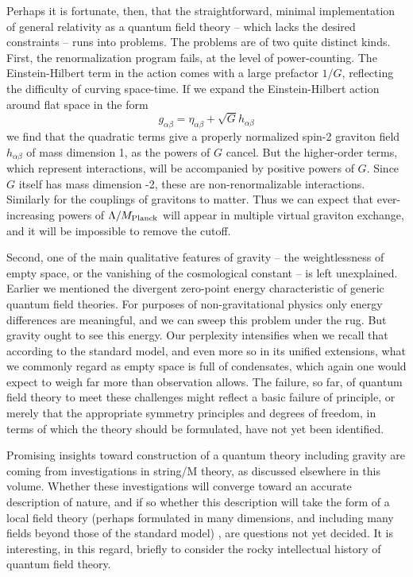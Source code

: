 \documentclass[aps,epsf]{revtex4}
\begin{document}
Perhaps it is fortunate, then, that the straightforward, minimal
implementation of general relativity as a quantum field theory --
which lacks the desired constraints -- runs into problems.  The
problems are of two quite distinct kinds.  First, the renormalization
program fails, at the level of power-counting.  The Einstein-Hilbert
term in the action comes with a large prefactor $1/G$, reflecting the
difficulty of curving space-time.  If we expand the Einstein-Hilbert
action around flat space in the form
\begin{equation}
g_{\alpha \beta} =
\eta_{\alpha\beta} +  \sqrt G h_{\alpha\beta}
\end{equation}
we find
that  the quadratic terms give a properly normalized spin-2  graviton
field $h_{\alpha\beta}$ of mass dimension 1, as the powers of $G$
cancel.   But the higher-order terms, which represent interactions,
will be accompanied by positive powers of $G$.  Since $G$ itself has
mass dimension -2, these are non-renormalizable interactions.
Similarly for the couplings of gravitons to matter.  Thus we can expect
that ever-increasing powers of $\Lambda/M_{\rm Planck}$ will appear in
multiple virtual graviton exchange, and it will be impossible to
remove the cutoff.  

Second, one of the main qualitative features of
gravity -- the weightlessness of empty space, or the vanishing of the
cosmological constant -- is left unexplained.   Earlier we mentioned
the divergent zero-point energy characteristic of generic quantum
field theories.  For  purposes of non-gravitational physics only energy
differences are meaningful, and we can sweep this problem under the
rug.  But gravity ought  to see this energy.   Our perplexity
intensifies  when we recall that according to the standard model, and
even more so in its unified extensions, what we commonly regard as
empty space is full of condensates, which again one would expect to
weigh far more than observation allows.  The failure, so far, of
quantum field theory to meet these challenges might reflect a basic
failure of principle, or merely that the appropriate symmetry
principles and degrees of freedom, in terms of which the theory should
be formulated, have not yet been identified.   

Promising insights toward construction of a quantum theory including
gravity are coming from investigations in string/M theory, as
discussed elsewhere in this volume.  Whether these investigations will
converge toward an accurate description of nature, and if so whether
this description will take the form of a local field theory (perhaps
formulated in many dimensions, and including many fields beyond those
of the standard model) , are questions not yet decided.  It is
interesting, in this regard, briefly to consider the rocky
intellectual history of quantum field theory.
\end{document}
